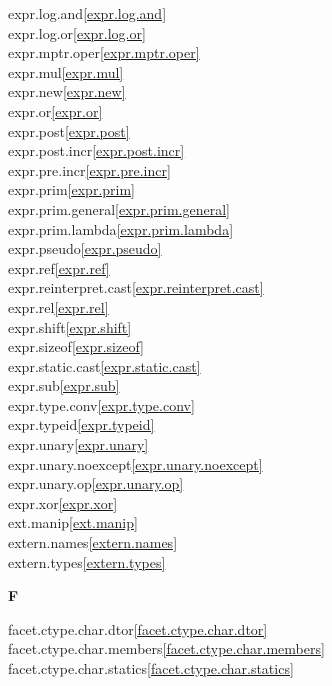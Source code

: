 \begin{multicols}{2}
expr.log.and\quad\ref{expr.log.and}\\
expr.log.or\quad\ref{expr.log.or}\\
expr.mptr.oper\quad\ref{expr.mptr.oper}\\
expr.mul\quad\ref{expr.mul}\\
expr.new\quad\ref{expr.new}\\
expr.or\quad\ref{expr.or}\\
expr.post\quad\ref{expr.post}\\
expr.post.incr\quad\ref{expr.post.incr}\\
expr.pre.incr\quad\ref{expr.pre.incr}\\
expr.prim\quad\ref{expr.prim}\\
expr.prim.general\quad\ref{expr.prim.general}\\
expr.prim.lambda\quad\ref{expr.prim.lambda}\\
expr.pseudo\quad\ref{expr.pseudo}\\
expr.ref\quad\ref{expr.ref}\\
expr.reinterpret.cast\quad\ref{expr.reinterpret.cast}\\
expr.rel\quad\ref{expr.rel}\\
expr.shift\quad\ref{expr.shift}\\
expr.sizeof\quad\ref{expr.sizeof}\\
expr.static.cast\quad\ref{expr.static.cast}\\
expr.sub\quad\ref{expr.sub}\\
expr.type.conv\quad\ref{expr.type.conv}\\
expr.typeid\quad\ref{expr.typeid}\\
expr.unary\quad\ref{expr.unary}\\
expr.unary.noexcept\quad\ref{expr.unary.noexcept}\\
expr.unary.op\quad\ref{expr.unary.op}\\
expr.xor\quad\ref{expr.xor}\\
ext.manip\quad\ref{ext.manip}\\
extern.names\quad\ref{extern.names}\\
extern.types\quad\ref{extern.types}\\
\par \textbf{F}\par
facet.ctype.char.dtor\quad\ref{facet.ctype.char.dtor}\\
facet.ctype.char.members\quad\ref{facet.ctype.char.members}\\
facet.ctype.char.statics\quad\ref{facet.ctype.char.statics}\\

\end{multicols}
